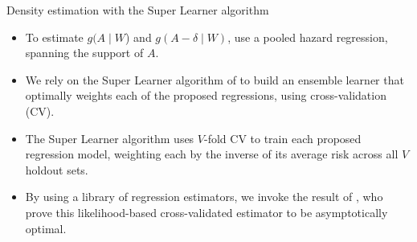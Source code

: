 \documentclass{beamer}
\begin{document}
\begin{frame}[c]{Density estimation with the Super Learner algorithm}

\begin{center}
\begin{itemize}
  \itemsep10pt
  \item To estimate $g(A \mid W$) and $g(A - \delta \mid W)$, use a pooled
    hazard regression, spanning the support of $A$.
  \item We rely on the Super Learner algorithm of \cite{vdl2007super} to build
    an ensemble learner that optimally weights each of the proposed regressions,
    using cross-validation (CV).
  \item The Super Learner algorithm uses $V$-fold CV to train each proposed
    regression model, weighting each by the inverse of its average risk across
    all $V$ holdout sets.
  \item By using a library of regression estimators, we invoke the result of
    \cite{vdl2004asymptotic}, who prove this likelihood-based cross-validated
    estimator to be asymptotically optimal.
\end{itemize}
\end{center}


\end{frame}

\end{document}

